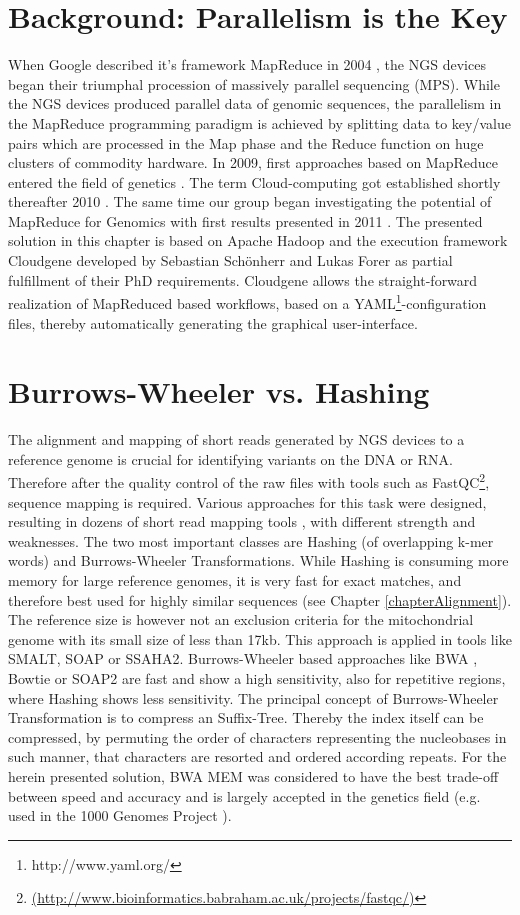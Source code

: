 \section{Background: Parallelism is the Key}
When Google described it's framework MapReduce in 2004 \cite{Dean2008}, the NGS devices began their triumphal procession of massively parallel sequencing (MPS). While the NGS devices produced parallel data of genomic sequences, the parallelism in the MapReduce programming paradigm is achieved by splitting data to key/value pairs which are processed in the Map phase and the Reduce function on huge clusters of commodity hardware. In 2009, first approaches based on MapReduce entered the field of genetics \cite{Schatz2009}. The term Cloud-computing got established shortly thereafter 2010 \cite{Schatz2010}. The same time our group began investigating the potential of MapReduce for Genomics with first results presented in 2011 \cite{DBLP:conf/gvd/SchonherrFWKSK11}. The presented solution in this chapter is based on Apache Hadoop and the execution framework Cloudgene \cite{Schonherr2012} developed by Sebastian Sch\"onherr and Lukas Forer as partial fulfillment of their PhD requirements. Cloudgene allows the straight-forward realization of MapReduced based workflows, based on a YAML\footnote{{http://www.yaml.org/}}-configuration files, thereby automatically generating the graphical user-interface. 

\section{Burrows-Wheeler vs. Hashing}
The alignment and mapping of short reads generated by NGS devices to a reference genome is crucial for identifying variants on the DNA or RNA. Therefore after the quality control of the raw files with tools such as FastQC\footnote{\url{(http://www.bioinformatics.babraham.ac.uk/projects/fastqc/)}}, sequence mapping is required. Various approaches for this task were designed, resulting in dozens of short read mapping tools  \cite{Hatem2013,Pabinger2013}, with different strength and weaknesses. The two most important classes are Hashing (of overlapping k-mer words) and Burrows-Wheeler Transformations. While Hashing is consuming more memory for large reference genomes, it is very fast for exact matches, and therefore best used for highly similar sequences (see Chapter \ref{chapterAlignment}). The reference size is however not an exclusion criteria for the mitochondrial genome with its small size of less than 17kb. This approach is applied in tools like SMALT, SOAP or SSAHA2. Burrows-Wheeler based approaches like BWA \cite{Li2009}, Bowtie \cite{Langmead2009} or SOAP2 are fast and show a high sensitivity, also for repetitive regions, where Hashing shows less sensitivity. The principal concept of Burrows-Wheeler Transformation is to compress an Suffix-Tree. Thereby the index itself can be compressed, by permuting the order of characters representing the nucleobases in such manner, that characters are resorted and ordered according repeats. For the herein presented solution, BWA MEM \cite{Li2013a} was considered to have the best trade-off between speed and accuracy and is largely accepted in the genetics field (e.g. used in the 1000 Genomes Project \cite{Abecasis2012}).

